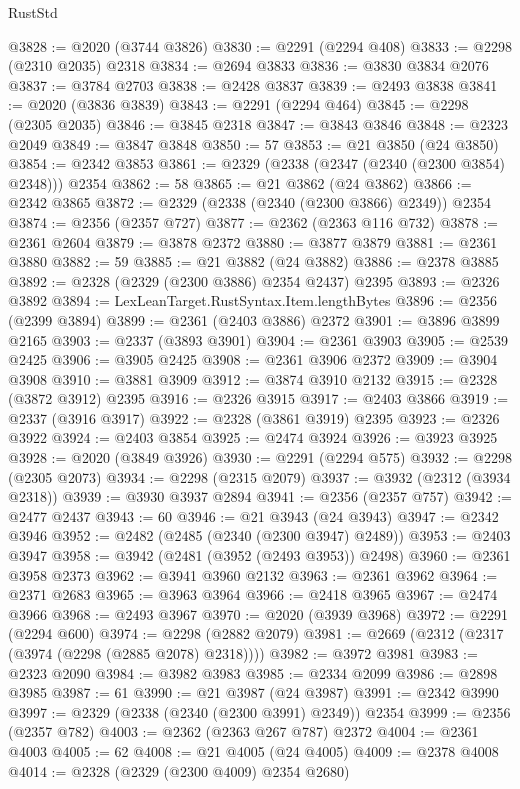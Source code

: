 \begin{lexlean}{RustStd}
\begin{coremodule}
{\begin{coremodule}
{{{{{{{{{{{{{{{{{{{{{{{{{{{{{{{{{{{{{@3828 := @2020 (@3744 @3826)
@3830 := @2291 (@2294 @408)
@3833 := @2298 (@2310 @2035) @2318
@3834 := @2694 @3833
@3836 := @3830 @3834 @2076
@3837 := @3784 @2703
@3838 := @2428 @3837
@3839 := @2493 @3838
@3841 := @2020 (@3836 @3839)
@3843 := @2291 (@2294 @464)
@3845 := @2298 (@2305 @2035)
@3846 := @3845 @2318
@3847 := @3843 @3846
@3848 := @2323 @2049
@3849 := @3847 @3848
@3850 := 57
@3853 := @21 @3850 (@24 @3850)
@3854 := @2342 @3853
@3861 := @2329 (@2338 (@2347 (@2340 (@2300 @3854) @2348))) @2354
@3862 := 58
@3865 := @21 @3862 (@24 @3862)
@3866 := @2342 @3865
@3872 := @2329 (@2338 (@2340 (@2300 @3866) @2349)) @2354
@3874 := @2356 (@2357 @727)
@3877 := @2362 (@2363 @116 @732)
@3878 := @2361 @2604
@3879 := @3878 @2372
@3880 := @3877 @3879
@3881 := @2361 @3880
@3882 := 59
@3885 := @21 @3882 (@24 @3882)
@3886 := @2378 @3885
@3892 := @2328 (@2329 (@2300 @3886) @2354 @2437) @2395
@3893 := @2326 @3892
@3894 := LexLeanTarget.RustSyntax.Item.lengthBytes
@3896 := @2356 (@2399 @3894)
@3899 := @2361 (@2403 @3886) @2372
@3901 := @3896 @3899 @2165
@3903 := @2337 (@3893 @3901)
@3904 := @2361 @3903
@3905 := @2539 @2425
@3906 := @3905 @2425
@3908 := @2361 @3906 @2372
@3909 := @3904 @3908
@3910 := @3881 @3909
@3912 := @3874 @3910 @2132
@3915 := @2328 (@3872 @3912) @2395
@3916 := @2326 @3915
@3917 := @2403 @3866
@3919 := @2337 (@3916 @3917)
@3922 := @2328 (@3861 @3919) @2395
@3923 := @2326 @3922
@3924 := @2403 @3854
@3925 := @2474 @3924
@3926 := @3923 @3925
@3928 := @2020 (@3849 @3926)
@3930 := @2291 (@2294 @575)
@3932 := @2298 (@2305 @2073)
@3934 := @2298 (@2315 @2079)
@3937 := @3932 (@2312 (@3934 @2318))
@3939 := @3930 @3937 @2894
@3941 := @2356 (@2357 @757)
@3942 := @2477 @2437
@3943 := 60
@3946 := @21 @3943 (@24 @3943)
@3947 := @2342 @3946
@3952 := @2482 (@2485 (@2340 (@2300 @3947) @2489))
@3953 := @2403 @3947
@3958 := @3942 (@2481 (@3952 (@2493 @3953)) @2498)
@3960 := @2361 @3958 @2373
@3962 := @3941 @3960 @2132
@3963 := @2361 @3962
@3964 := @2371 @2683
@3965 := @3963 @3964
@3966 := @2418 @3965
@3967 := @2474 @3966
@3968 := @2493 @3967
@3970 := @2020 (@3939 @3968)
@3972 := @2291 (@2294 @600)
@3974 := @2298 (@2882 @2079)
@3981 := @2669 (@2312 (@2317 (@3974 (@2298 (@2885 @2078) @2318))))
@3982 := @3972 @3981
@3983 := @2323 @2090
@3984 := @3982 @3983
@3985 := @2334 @2099
@3986 := @2898 @3985
@3987 := 61
@3990 := @21 @3987 (@24 @3987)
@3991 := @2342 @3990
@3997 := @2329 (@2338 (@2340 (@2300 @3991) @2349)) @2354
@3999 := @2356 (@2357 @782)
@4003 := @2362 (@2363 @267 @787) @2372
@4004 := @2361 @4003
@4005 := 62
@4008 := @21 @4005 (@24 @4005)
@4009 := @2378 @4008
@4014 := @2328 (@2329 (@2300 @4009) @2354 @2680)
}}}}}}}}}}}}}}}}}}}}}}}}}}}}}}}}}}}}}
\end{coremodule}}
\end{coremodule}
\end{lexlean}
